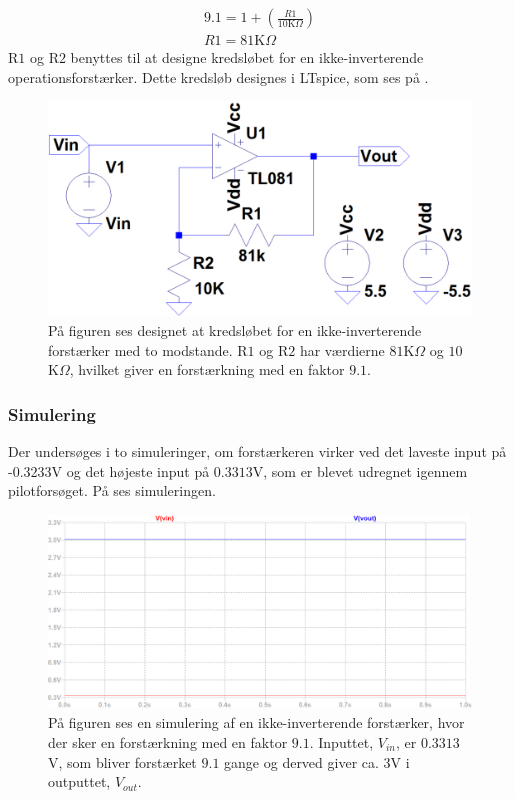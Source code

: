 \begin{align}
9.1 = 1 + (\frac{R1}{10\text{K}\Omega})\\
R1 = 81\text{K}\Omega
\end{align}
\noindent R$1$ og R$2$ benyttes til at designe kredsløbet for en ikke-inverterende operationsforstærker. Dette kredsløb designes i LTspice, som ses på . 
\begin{figure}[H]
\centering
\includegraphics[scale=0.3]{figures/cProblemloesning/Forstaerker_faktor18.PNG}
\caption{På figuren ses designet at kredsløbet for en ikke-inverterende forstærker med to modstande. R$1$ og R$2$ har værdierne $81$K$\Omega$ og $10$K$\Omega$, hvilket giver en forstærkning med en faktor $9.1$.}
\label{fig:Forstaerker_faktor18}
\end{figure} 

\subsubsection{Simulering}\label{Subsec:Forstaerker_simu}
Der undersøges i to simuleringer, om forstærkeren virker ved det laveste input på -$0.3233$V og det højeste input på $0.3313$V, som er blevet udregnet igennem pilotforsøget. På  ses simuleringen.

\begin{figure}[H]
\centering
\includegraphics[scale=0.36]{figures/cProblemloesning/Forstaerker_faktor18_simulering.PNG}
\caption{På figuren ses en simulering af en ikke-inverterende forstærker, hvor der sker en forstærkning med en faktor $9.1$. Inputtet, $V_{in}$, er $0.3313$V, som bliver forstærket $9.1$ gange og derved giver ca. $3$V i outputtet, $V_{out}$.}
\label{fig:Forstaerker_faktor18_simulering}
\end{figure}

